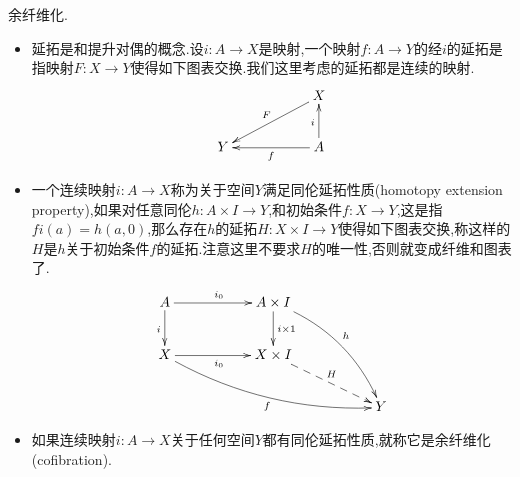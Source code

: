 余纤维化.
\begin{itemize}
	\item 延拓是和提升对偶的概念.设$i:A\to X$是映射,一个映射$f:A\to Y$的经$i$的延拓是指映射$F:X\to Y$使得如下图表交换.我们这里考虑的延拓都是连续的映射.
	$$\xymatrix{&&X\ar[dll]_F\\Y&&A\ar[u]^i\ar[ll]^f}$$
	\item 一个连续映射$i:A\to X$称为关于空间$Y$满足同伦延拓性质(homotopy extension property),如果对任意同伦$h:A\times I\to Y$,和初始条件$f:X\to Y$,这是指$fi(a)=h(a,0)$,那么存在$h$的延拓$H:X\times I\to Y$使得如下图表交换,称这样的$H$是$h$关于初始条件$f$的延拓.注意这里不要求$H$的唯一性,否则就变成纤维和图表了.
	$$\xymatrix{A\ar[rr]^{i_0}\ar[d]_i&&A\times I\ar[d]^{i\times1}\ar@/^1pc/[ddrr]^h&&\\X\ar[rr]_{i_0}\ar@/_1pc/[drrrr]_f&&X\times I\ar@{-->}[drr]^H&&\\&&&&Y}$$
	\item 如果连续映射$i:A\to X$关于任何空间$Y$都有同伦延拓性质,就称它是余纤维化(cofibration).
\end{itemize}
